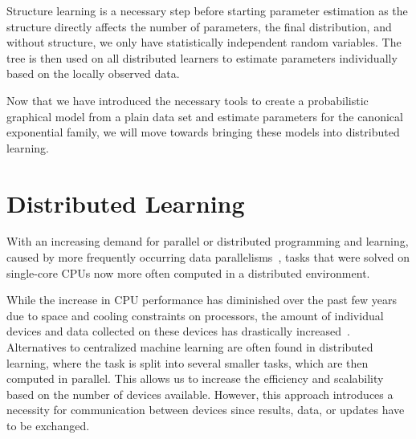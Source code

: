 Structure learning is a necessary step before starting parameter estimation as the structure directly affects the number of parameters, the final distribution, and without structure, we only have statistically independent random variables. 
The tree is then used on all distributed learners to estimate parameters individually based on the locally observed data. 

Now that we have introduced the necessary tools to create a probabilistic graphical model from a plain data set and estimate parameters for the canonical exponential family, we will move towards bringing these models into distributed learning.


\section{Distributed Learning}
With an increasing demand for parallel or distributed programming and learning, caused by more frequently occurring data parallelisms~\cite{ben2006principles}, tasks that were solved on single-core CPUs now more often computed in a distributed environment.

While the increase in CPU performance has diminished over the past few years~\cite{herlihy2011art} due to space and cooling constraints on processors, the amount of individual devices and data collected on these devices has drastically increased~\cite{kaisler2013big}.
Alternatives to centralized machine learning are often found in distributed learning, where the task is split into several smaller tasks, which are then computed in parallel. 
This allows us to increase the efficiency and scalability based on the number of devices available.
However, this approach introduces a necessity for communication between devices since results, data, or updates have to be exchanged.

